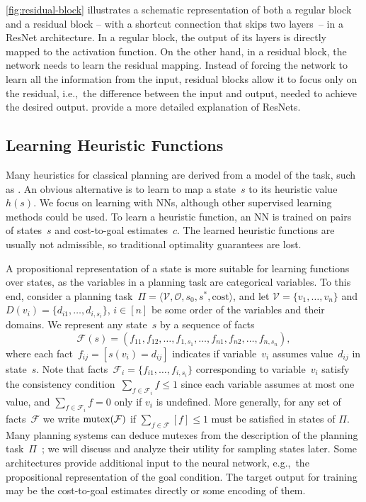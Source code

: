 \cref{fig:residual-block} illustrates a schematic representation of both a regular block and a residual block -- with a shortcut connection that skips two layers~-- in a ResNet architecture. In a regular block, the output of its layers is directly mapped to the activation function. On the other hand, in a residual block, the network needs to learn the residual mapping. Instead of forcing the network to learn all the information from the input, residual blocks allow it to focus only on the residual, i.e.,~the difference between the input and output, needed to achieve the desired output. \citet{He.etal/2016} provide a more detailed explanation of ResNets.

\subsection{Learning Heuristic Functions}
\label{sec:learning-heuristics}

Many heuristics for classical planning are derived from a model of the task, such as \sas. An obvious alternative is to learn to map a state~$s$ to its heuristic value~$h(s)$. We focus on learning with NNs, although other supervised learning methods could be used. To learn a heuristic function, an NN is trained on pairs of states~$s$ and cost-to-goal estimates~$c$. The learned heuristic functions are usually not admissible, so traditional optimality guarantees are lost.

A propositional representation of a state is more suitable for learning functions over states, as the variables in a planning task are categorical variables. To this end, consider a planning task~$\Pi=\langle\mathcal{V},\mathcal{O},s_0,s^*, \text{cost}\rangle$, and let $\mathcal{V}=\{v_1,\ldots,v_n\}$ and $D(v_i)=\{d_{i1},\ldots,d_{i,s_i}\}$, $i\in[n]$ be some order of the variables and their domains. We represent any state~$s$ by a sequence of facts $$\mathcal{F}(s)=(f_{11},f_{12},\ldots,f_{1,s_1},\ldots,f_{n1},f_{n2},\ldots,f_{n,s_n}),$$ where each fact~$f_{ij}=[s(v_i)=d_{ij}]$ indicates if variable~$v_i$ assumes value~$d_{ij}$ in state~$s$. Note that facts~$\mathcal{F}_i=\{f_{i1},\ldots,f_{i,s_i}\}$ corresponding to variable~$v_i$ satisfy the consistency condition~$\sum_{f\in \mathcal{F}_i} f\leq 1$ since each variable assumes at most one value, and $\sum_{f\in \mathcal{F}_i} f=0$ only if $v_i$ is undefined. More generally, for any set of facts~$\mathcal{F}$ we write $\operatorname{mutex}(\mathcal{F})$ if $\sum_{f\in \mathcal{F}} [f]\leq 1$ must be satisfied in states of $\Pi$. Many planning systems can deduce mutexes from the description of the planning task~$\Pi$~\cite{Helmert/2009}; we will discuss and analyze their utility for sampling states later. Some architectures provide additional input to the neural network, e.g.,~the propositional representation of the goal condition. The target output for training may be the cost-to-goal estimates directly or some encoding of them.

